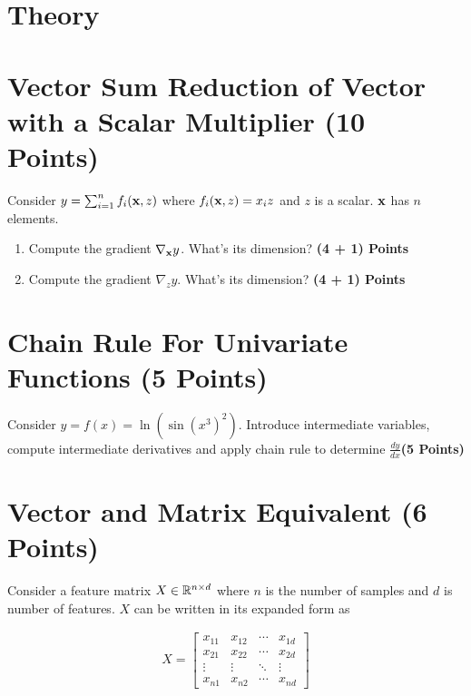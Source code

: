 \documentclass[12pt, xcolor=dvipsnames,svgnames,x11names]{article}
\begin{document}
\section*{Theory}

\section{Vector Sum Reduction of Vector with a Scalar Multiplier (10 Points)}
Consider $y = \sum_{i=1}^n f_i({\mathbf x}, z)$ where $f_i({\mathbf x}, z) = x_i z$ and $z$ is a scalar. ${\mathbf x}$ has $n$ elements.

\begin{enumerate}

\item Compute the gradient $\nabla_{\mathbf x} y$. What's its dimension?  \hfill \textbf{(4 + 1) Points}

\item Compute the gradient $\nabla_z y$. What's its dimension?  \hfill \textbf{(4 + 1) Points}
\end{enumerate}

\section{Chain Rule For Univariate Functions (5 Points)}

Consider $ y = f(x) = \ln (\sin(x^3)^2)$. Introduce intermediate variables,  compute intermediate derivatives and apply chain rule to determine $\frac{dy}{dx}$\hfill \textbf{(5 Points)}


\section{Vector and Matrix Equivalent (6 Points)}
Consider a feature matrix $X \in {\mathbb R}^{n\times d}$ where $n$ is the number of samples and $d$ is number of features. $X$ can be written in its expanded form as 

\begin{align}
\label{eq:feature_matrix}
X =  \begin{bmatrix}
x_{11} & x_{12} & \cdots & x_{1d} \\
x_{21} & x_{22} & \cdots & x_{2d} \\
\vdots & \vdots & \ddots & \vdots \\
x_{n1} & x_{n2} & \cdots & x_{nd}
\end{bmatrix}
\end{align}
\end{document}
